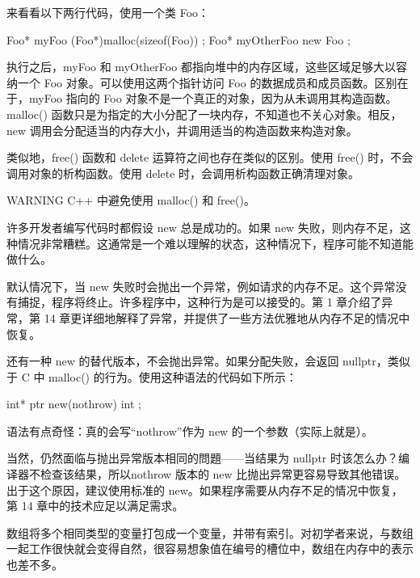 来看看以下两行代码，使用一个类 Foo：

\begin{cpp}
Foo* myFoo { (Foo*)malloc(sizeof(Foo)) };
Foo* myOtherFoo { new Foo{} };
\end{cpp}

执行之后，myFoo 和 myOtherFoo 都指向堆中的内存区域，这些区域足够大以容纳一个 Foo 对象。可以使用这两个指针访问 Foo 的数据成员和成员函数。区别在于，myFoo 指向的 Foo 对象不是一个真正的对象，因为从未调用其构造函数。malloc() 函数只是为指定的大小分配了一块内存，不知道也不关心对象。相反，new 调用会分配适当的内存大小，并调用适当的构造函数来构造对象。

类似地，free() 函数和 delete 运算符之间也存在类似的区别。使用 free() 时，不会调用对象的析构函数。使用 delete 时，会调用析构函数正确清理对象。

\begin{myWarning}{WARNING}
C++ 中避免使用 malloc() 和 free()。
\end{myWarning}


许多开发者编写代码时都假设 new 总是成功的。如果 new 失败，则内存不足，这种情况非常糟糕。这通常是一个难以理解的状态，这种情况下，程序可能不知道能做什么。

默认情况下，当 new 失败时会抛出一个异常，例如请求的内存不足。这个异常没有捕捉，程序将终止。许多程序中，这种行为是可以接受的。第 1 章介绍了异常，第 14 章更详细地解释了异常，并提供了一些方法优雅地从内存不足的情况中恢复。

还有一种 new 的替代版本，不会抛出异常。如果分配失败，会返回 nullptr，类似于 C 中 malloc() 的行为。使用这种语法的代码如下所示：

\begin{cpp}
int* ptr { new(nothrow) int };
\end{cpp}

语法有点奇怪：真的会写“nothrow”作为 new 的一个参数（实际上就是）。

当然，仍然面临与抛出异常版本相同的問題——当结果为 nullptr 时该怎么办？编译器不检查该结果，所以nothrow 版本的 new 比抛出异常更容易导致其他错误。出于这个原因，建议使用标准的 new。如果程序需要从内存不足的情况中恢复，第 14 章中的技术应足以满足需求。


数组将多个相同类型的变量打包成一个变量，并带有索引。对初学者来说，与数组一起工作很快就会变得自然，很容易想象值在编号的槽位中，数组在内存中的表示也差不多。


